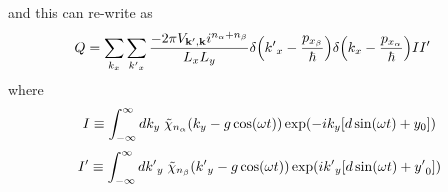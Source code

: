 and this can re-write as
\begin{equation} \label{4.27}
  \begin{aligned}
    Q =
    \sum_{k_x}\sum_{{k'}_x}
    \frac{-2\pi V_{\mathbf{k'},\mathbf{k}} i^{n_{\alpha} + n_{\beta}}}{L_x L_y} &
    \delta\qty({k'}_x -\frac{p_{x_{\beta}}}{\hbar})
    \delta\qty(k_x -\frac{p_{x_{\alpha}}}{\hbar})
    I I'
  \end{aligned}
\end{equation}
where
\begin{equation} \label{4.28}
  \begin{aligned}
    I \equiv
    \int_{-\infty}^{\infty} dk_y \;
    \tilde{\chi}_{n_{\alpha}}\qty(k_y -g\cos(\omega t))
    \exp(
      -ik_y  \qty[d\sin(\omega t) + y_0]
    )
  \end{aligned}
\end{equation}
\begin{equation} \label{4.29}
  \begin{aligned}
    I' \equiv
    \int_{-\infty}^{\infty} d{k'}_y \;
    \tilde{\chi}_{n_{\beta}}\qty({k'}_y -g\cos(\omega t))
    \exp(
      i{k'}_y  \qty[d\sin(\omega t) + {y'}_0]
    )
  \end{aligned}
\end{equation}


